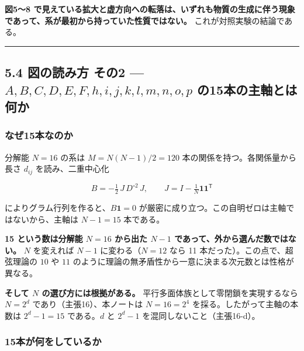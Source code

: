 \documentclass[
  10pt,
]{ltjsarticle}
\begin{document}
\textbf{図5〜8
で見えている拡大と虚方向への転落は、いずれも物質の生成に伴う現象であって、系が最初から持っていた性質ではない。}
これが対照実験の結論である。

\begin{center}\rule{0.5\linewidth}{0.5pt}\end{center}

\subsection{\texorpdfstring{5.4 図の読み方 その2 ---
\(A,B,C,D,E,F,h,i,j,k,l,m,n,o,p\)
の15本の主軸とは何か}{5.4 図の読み方 その2 --- A,B,C,D,E,F,h,i,j,k,l,m,n,o,p の15本の主軸とは何か}}\label{ux56f3ux306eux8aadux307fux65b9-ux305dux306e2-abcdefhijklmnop-ux306e15ux672cux306eux4e3bux8ef8ux3068ux306fux4f55ux304b}

\subsubsection{なぜ15本なのか}\label{ux306aux305c15ux672cux306aux306eux304b}

分解能 \(N = 16\) の系は \(M = N(N-1)/2 = 120\)
本の関係を持つ。各関係量から長さ \(d_{ij}\) を読み、二重中心化

\[B = -\tfrac12\,J\,D^{\circ 2}\,J,\qquad J = I - \tfrac1N\mathbf{1}\mathbf{1}^{\mathsf T}\]

によりグラム行列を作ると、\(B\mathbf{1} = 0\)
が厳密に成り立つ。この自明ゼロは主軸ではないから、主軸は \(N - 1 = 15\)
本である。

\textbf{15 という数は分解能 \(N=16\) から出た \(N-1\)
であって、外から選んだ数ではない。} \(N\) を変えれば \(N-1\)
に変わる（\(N=12\) なら 11 本だった）。この点で、超弦理論の \(10\) や
\(11\) のように理論の無矛盾性から一意に決まる次元数とは性格が異なる。

\textbf{そして \(N\) の選び方には根拠がある。}
平行多面体族として零閉鎖を実現するなら \(N = 2^d\)
であり（主張16）、本ノートは \(N = 16 = 2^4\)
を採る。したがって主軸の本数は \(2^d - 1 = 15\) である。\(d\) と
\(2^d-1\) を混同しないこと（主張16-d）。

\subsubsection{15本が何をしているか}\label{ux672cux304cux4f55ux3092ux3057ux3066ux3044ux308bux304b}
\end{document}
